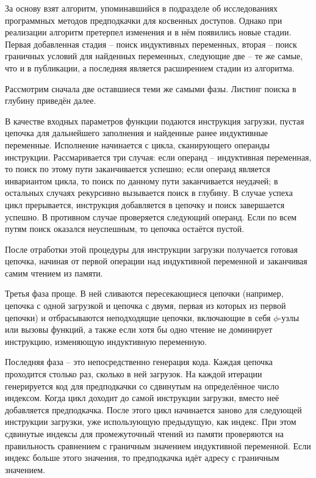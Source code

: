 \documentclass[12pt,a4paper]{article}
\begin{document}
\indent

За основу взят алгоритм, упоминавшийся в подразделе об исследованиях программных методов предподкачки для косвенных доступов. Однако при реализации алгоритм претерпел изменения и в нём появились новые стадии. Первая добавленная стадия -- поиск индуктивных переменных, вторая -- поиск граничных условий для найденных переменных, следующие две -- те же самые, что и в публикации, а последняя является расширением стадии из алгоритма.

Рассмотрим сначала две оставшиеся теми же самыми фазы. Листинг поиска в глубину приведён далее.



В качестве входных параметров функции подаются инструкция загрузки, пустая цепочка для дальнейшего заполнения и найденные ранее индуктивные переменные. Исполнение начинается с цикла, сканирующего операнды инструкции. Рассмаривается три случая: если операнд -- индуктивная переменная, то поиск по этому пути заканчивается успешно; если операнд является инвариантом цикла, то поиск по данному пути заканчивается неудачей; в остальных случаях рекурсивно вызывается поиск в глубину. В случае успеха цикл прерывается, инструкция добавляется в цепочку и поиск завершается успешно. В противном случае проверяется следующий операнд. Если по всем путям поиск оказался неуспешным, то цепочка остаётся пустой.

После отработки этой процедуры для инструкции загрузки получается готовая цепочка, начиная от первой операции над индуктивной переменной и заканчивая самим чтением из памяти.

Третья фаза проще. В ней сливаются пересекающиеся цепочки (например, цепочка с одной загрузкой и цепочка с двумя, первая из которых из первой цепочки) и отбрасываются неподходящие цепочки, включающие в себя $\phi$-узлы или вызовы функций, а также если хотя бы одно чтение не доминирует инструкцию, изменяющую индуктивную переменную.

Последняя фаза -- это непосредственно генерация кода. Каждая цепочка проходится столько раз, сколько в ней загрузок. На каждой итерации генерируется код для предподкачки со сдвинутым на определённое число индексом. Когда цикл доходит до самой инструкции загрузки, вместо неё добавляется предподкачка. После этого цикл начинается заново для следующей инструкции загрузки, уже использующую предыдущую, как индекс. При этом сдвинутые индексы для промежуточный чтений из памяти проверяются на правильность сравнением с граничным значением индуктивной переменной. Если индекс больше этого значения, то предподкачка идёт адресу с граничным значением.
\end{document}
